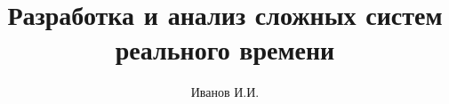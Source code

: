 \documentclass[12pt,a4paper,oneside,final]{report}
\author{Иванов И.И.}
\title{Разработка и анализ сложных систем реального времени}
\newcommand{\pwd}{templates/NIR}
\begin{document}
    \maketitle
    \setcounter{page}{2}
    \clearpage
    
    \clearpage
    \tableofcontents{}
    \clearpage
    
    \clearpage
    
    \clearpage
    
    \clearpage
    
    \clearpage
    
    \clearpage
    
    \clearpage
    
    \clearpage
    \appendixtocon
    \appendix
    \renewcommand\thechapter{\Asbuk{chapter}}
    
\end{document}
